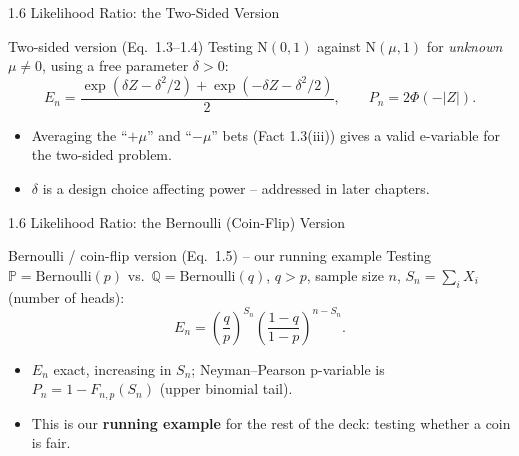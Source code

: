 \documentclass[aspectratio=169,10pt]{beamer}
\begin{document}
\begin{frame}{1.6 Likelihood Ratio: the Two-Sided Version}

\begin{block}{Two-sided version (Eq.\ 1.3--1.4)}
Testing $\mathrm{N}(0,1)$ against $\mathrm{N}(\mu,1)$ for \emph{unknown}
$\mu\neq 0$, using a free parameter $\delta>0$:
\[
  E_n = \frac{\exp(\delta Z - \delta^2/2) + \exp(-\delta Z - \delta^2/2)}{2},
  \qquad
  P_n = 2\Phi(-|Z|).
\]
\begin{itemize}
  \item Averaging the ``$+\mu$'' and ``$-\mu$'' bets (Fact 1.3(iii)) gives
    a valid e-variable for the two-sided problem.
  \item $\delta$ is a design choice affecting power -- addressed in later
    chapters.
\end{itemize}
\end{block}

\end{frame}

\begin{frame}{1.6 Likelihood Ratio: the Bernoulli (Coin-Flip) Version}

\begin{block}{Bernoulli / coin-flip version (Eq.\ 1.5) -- our running example}
Testing $\mathbb{P}=\mathrm{Bernoulli}(p)$ vs.\ $\mathbb{Q}=\mathrm{Bernoulli}(q)$,
$q>p$, sample size $n$, $S_n=\sum_i X_i$ (number of heads):
\[
  E_n = \left(\frac{q}{p}\right)^{S_n}\left(\frac{1-q}{1-p}\right)^{n-S_n}.
\]
\begin{itemize}
  \item $E_n$ exact, increasing in $S_n$; Neyman--Pearson p-variable is
    $P_n = 1 - F_{n,p}(S_n)$ (upper binomial tail).
  \item This is our \textbf{running example} for the rest of the deck:
    testing whether a coin is fair.
\end{itemize}
\end{block}

\end{frame}
\end{document}
